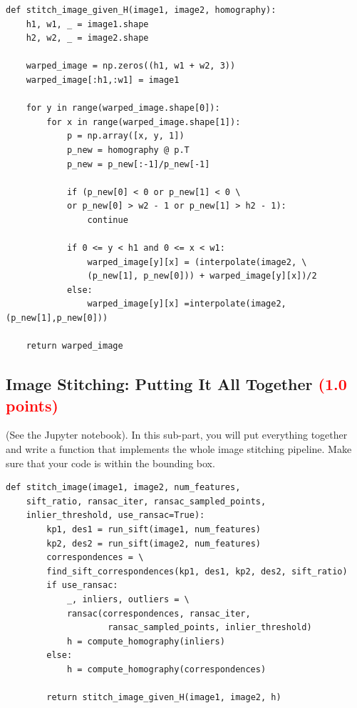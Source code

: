 \documentclass[answers]{exam}
\newcommand{\mypoints}[1]{\textcolor{red}{(#1 points)}}
\begin{document}
\begin{solution}
\begin{verbatim}
def stitch_image_given_H(image1, image2, homography):
    h1, w1, _ = image1.shape
    h2, w2, _ = image2.shape
    
    warped_image = np.zeros((h1, w1 + w2, 3))
    warped_image[:h1,:w1] = image1
    
    for y in range(warped_image.shape[0]):
        for x in range(warped_image.shape[1]):
            p = np.array([x, y, 1])
            p_new = homography @ p.T
            p_new = p_new[:-1]/p_new[-1]

            if (p_new[0] < 0 or p_new[1] < 0 \ 
            or p_new[0] > w2 - 1 or p_new[1] > h2 - 1):
                continue

            if 0 <= y < h1 and 0 <= x < w1:
                warped_image[y][x] = (interpolate(image2, \ 
                (p_new[1], p_new[0])) + warped_image[y][x])/2
            else:
                warped_image[y][x] =interpolate(image2,(p_new[1],p_new[0]))

    return warped_image

\end{verbatim}
\end{solution}

\subsection{Image Stitching: Putting It All Together \mypoints{1.0}}
(See the Jupyter notebook). In this sub-part, you will put everything together and write a function that implements the whole image stitching pipeline. Make sure that your code is within the bounding box.

\begin{solution}
\begin{verbatim}
def stitch_image(image1, image2, num_features, 
    sift_ratio, ransac_iter, ransac_sampled_points, 
    inlier_threshold, use_ransac=True):
        kp1, des1 = run_sift(image1, num_features)
        kp2, des2 = run_sift(image2, num_features)
        correspondences = \ 
        find_sift_correspondences(kp1, des1, kp2, des2, sift_ratio)
        if use_ransac:
            _, inliers, outliers = \ 
            ransac(correspondences, ransac_iter,
                    ransac_sampled_points, inlier_threshold)
            h = compute_homography(inliers)
        else:
            h = compute_homography(correspondences)
        
        return stitch_image_given_H(image1, image2, h)
    
        
\end{verbatim}
\end{solution}
\end{document}
